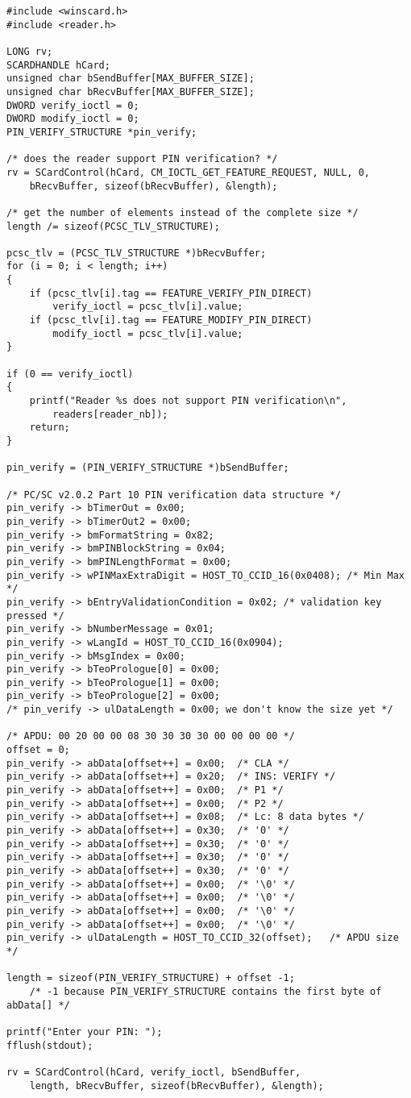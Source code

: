 \documentclass[a4paper,12pt]{article}
\begin{document}
\begin{verbatim}
#include <winscard.h>
#include <reader.h>

LONG rv;
SCARDHANDLE hCard;
unsigned char bSendBuffer[MAX_BUFFER_SIZE];
unsigned char bRecvBuffer[MAX_BUFFER_SIZE];
DWORD verify_ioctl = 0;
DWORD modify_ioctl = 0;
PIN_VERIFY_STRUCTURE *pin_verify;

/* does the reader support PIN verification? */
rv = SCardControl(hCard, CM_IOCTL_GET_FEATURE_REQUEST, NULL, 0,
    bRecvBuffer, sizeof(bRecvBuffer), &length);

/* get the number of elements instead of the complete size */
length /= sizeof(PCSC_TLV_STRUCTURE);

pcsc_tlv = (PCSC_TLV_STRUCTURE *)bRecvBuffer;
for (i = 0; i < length; i++)
{
    if (pcsc_tlv[i].tag == FEATURE_VERIFY_PIN_DIRECT)
        verify_ioctl = pcsc_tlv[i].value;
    if (pcsc_tlv[i].tag == FEATURE_MODIFY_PIN_DIRECT)
        modify_ioctl = pcsc_tlv[i].value;
}

if (0 == verify_ioctl)
{
    printf("Reader %s does not support PIN verification\n",
        readers[reader_nb]);
    return;
}

pin_verify = (PIN_VERIFY_STRUCTURE *)bSendBuffer;

/* PC/SC v2.0.2 Part 10 PIN verification data structure */
pin_verify -> bTimerOut = 0x00;
pin_verify -> bTimerOut2 = 0x00;
pin_verify -> bmFormatString = 0x82;
pin_verify -> bmPINBlockString = 0x04;
pin_verify -> bmPINLengthFormat = 0x00;
pin_verify -> wPINMaxExtraDigit = HOST_TO_CCID_16(0x0408); /* Min Max */
pin_verify -> bEntryValidationCondition = 0x02; /* validation key pressed */
pin_verify -> bNumberMessage = 0x01;
pin_verify -> wLangId = HOST_TO_CCID_16(0x0904);
pin_verify -> bMsgIndex = 0x00;
pin_verify -> bTeoPrologue[0] = 0x00;
pin_verify -> bTeoPrologue[1] = 0x00;
pin_verify -> bTeoPrologue[2] = 0x00;
/* pin_verify -> ulDataLength = 0x00; we don't know the size yet */

/* APDU: 00 20 00 00 08 30 30 30 30 00 00 00 00 */
offset = 0;
pin_verify -> abData[offset++] = 0x00;  /* CLA */
pin_verify -> abData[offset++] = 0x20;  /* INS: VERIFY */
pin_verify -> abData[offset++] = 0x00;  /* P1 */
pin_verify -> abData[offset++] = 0x00;  /* P2 */
pin_verify -> abData[offset++] = 0x08;  /* Lc: 8 data bytes */
pin_verify -> abData[offset++] = 0x30;  /* '0' */
pin_verify -> abData[offset++] = 0x30;  /* '0' */
pin_verify -> abData[offset++] = 0x30;  /* '0' */
pin_verify -> abData[offset++] = 0x30;  /* '0' */
pin_verify -> abData[offset++] = 0x00;  /* '\0' */
pin_verify -> abData[offset++] = 0x00;  /* '\0' */
pin_verify -> abData[offset++] = 0x00;  /* '\0' */
pin_verify -> abData[offset++] = 0x00;  /* '\0' */
pin_verify -> ulDataLength = HOST_TO_CCID_32(offset);   /* APDU size */

length = sizeof(PIN_VERIFY_STRUCTURE) + offset -1;
    /* -1 because PIN_VERIFY_STRUCTURE contains the first byte of abData[] */

printf("Enter your PIN: ");
fflush(stdout);

rv = SCardControl(hCard, verify_ioctl, bSendBuffer,
    length, bRecvBuffer, sizeof(bRecvBuffer), &length);
\end{verbatim}




\end{document}
